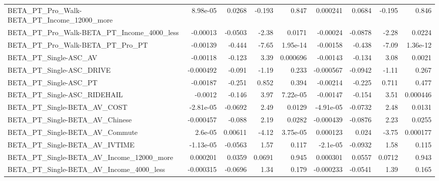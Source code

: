 \begin{tabular}{lrrrrrrrr}
BETA\_PT\_Pro\_Walk-BETA\_PT\_Income\_12000\_more         &    8.98e-05 &       0.0268 &    -0.193 &    0.847 &   0.000241 &      0.0684 &       -0.195 &         0.846 \\
BETA\_PT\_Pro\_Walk-BETA\_PT\_Income\_4000\_less          &    -0.00013 &      -0.0503 &     -2.38 &   0.0171 &   -0.00024 &     -0.0878 &        -2.28 &        0.0224 \\
BETA\_PT\_Pro\_Walk-BETA\_PT\_Pro\_PT                    &    -0.00139 &       -0.444 &     -7.65 & 1.95e-14 &   -0.00158 &      -0.438 &        -7.09 &      1.36e-12 \\
BETA\_PT\_Single-ASC\_AV                              &    -0.00118 &       -0.123 &      3.39 & 0.000696 &   -0.00143 &      -0.134 &         3.08 &        0.0021 \\
BETA\_PT\_Single-ASC\_DRIVE                           &   -0.000492 &       -0.091 &     -1.19 &    0.233 &  -0.000567 &     -0.0942 &        -1.11 &         0.267 \\
BETA\_PT\_Single-ASC\_PT                              &    -0.00187 &       -0.251 &     0.852 &    0.394 &   -0.00214 &      -0.225 &        0.711 &         0.477 \\
BETA\_PT\_Single-ASC\_RIDEHAIL                        &     -0.0012 &       -0.146 &      3.97 & 7.22e-05 &   -0.00147 &      -0.154 &         3.51 &      0.000446 \\
BETA\_PT\_Single-BETA\_AV\_COST                        &   -2.81e-05 &      -0.0692 &      2.49 &   0.0129 &  -4.91e-05 &     -0.0732 &         2.48 &        0.0131 \\
BETA\_PT\_Single-BETA\_AV\_Chinese                     &   -0.000457 &       -0.088 &      2.19 &   0.0282 &  -0.000439 &     -0.0876 &         2.23 &        0.0255 \\
BETA\_PT\_Single-BETA\_AV\_Commute                     &     2.6e-05 &      0.00611 &     -4.12 & 3.75e-05 &   0.000123 &       0.024 &        -3.75 &      0.000177 \\
BETA\_PT\_Single-BETA\_AV\_IVTIME                      &   -1.13e-05 &      -0.0563 &      1.57 &    0.117 &   -2.1e-05 &     -0.0932 &         1.58 &         0.115 \\
BETA\_PT\_Single-BETA\_AV\_Income\_12000\_more           &    0.000201 &       0.0359 &    0.0691 &    0.945 &   0.000301 &      0.0557 &       0.0712 &         0.943 \\
BETA\_PT\_Single-BETA\_AV\_Income\_4000\_less            &   -0.000315 &      -0.0696 &      1.34 &    0.179 &  -0.000233 &     -0.0541 &         1.39 &         0.165 \\

\end{tabular}
